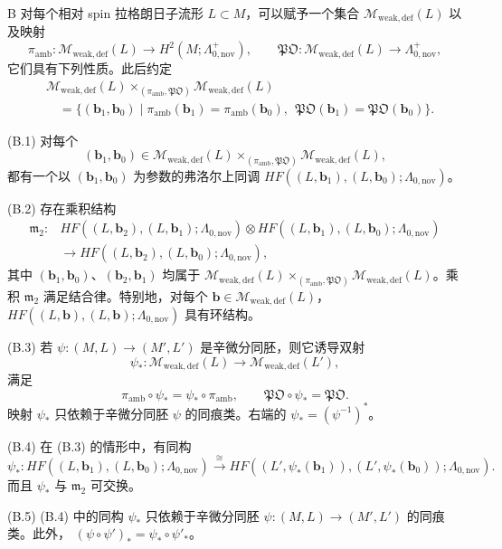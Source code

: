 \begin{theorem}{B}\label{thm:B}
对每个相对 spin 拉格朗日子流形 $L\subset M$，可以赋予一个集合
$\mathcal M_{\mathrm{weak,def}}(L)$ 以及映射
\[
  \pi_{\mathrm{amb}}\colon\mathcal M_{\mathrm{weak,def}}(L)
  \longrightarrow H^2(M;\Lambda^+_{0,\mathrm{nov}}),
  \qquad
  \mathfrak{PO}\colon\mathcal M_{\mathrm{weak,def}}(L)
  \longrightarrow\Lambda^+_{0,\mathrm{nov}},
\]
它们具有下列性质。此后约定
\begin{equation}
\begin{aligned}
  &\mathcal M_{\mathrm{weak,def}}(L)
  \mathbin{\times_{(\pi_{\mathrm{amb}},\mathfrak{PO})}}
  \mathcal M_{\mathrm{weak,def}}(L)\\
  &\quad=\{(\mathbf b_1,\mathbf b_0)\mid
  \pi_{\mathrm{amb}}(\mathbf b_1)=\pi_{\mathrm{amb}}(\mathbf b_0),\
  \ \mathfrak{PO}(\mathbf b_1)=\mathfrak{PO}(\mathbf b_0)\}.
\end{aligned}
\tag{1.9}\label{eq:1-9}
\end{equation}

\textup{(B.1)} 对每个
\[
  (\mathbf b_1,\mathbf b_0)\in
  \mathcal M_{\mathrm{weak,def}}(L)
  \mathbin{\times_{(\pi_{\mathrm{amb}},\mathfrak{PO})}}
  \mathcal M_{\mathrm{weak,def}}(L),
\]
都有一个以 $(\mathbf b_1,\mathbf b_0)$ 为参数的弗洛尔上同调
$HF((L,\mathbf b_1),(L,\mathbf b_0);\Lambda_{0,\mathrm{nov}})$。

\textup{(B.2)} 存在乘积结构
\[
\begin{aligned}
  \mathfrak m_2\colon
  &HF((L,\mathbf b_2),(L,\mathbf b_1);\Lambda_{0,\mathrm{nov}})
  \otimes HF((L,\mathbf b_1),(L,\mathbf b_0);\Lambda_{0,\mathrm{nov}})\\
  &\longrightarrow HF((L,\mathbf b_2),(L,\mathbf b_0);\Lambda_{0,\mathrm{nov}}),
\end{aligned}
\]
其中 $(\mathbf b_1,\mathbf b_0)$、$(\mathbf b_2,\mathbf b_1)$ 均属于
$\mathcal M_{\mathrm{weak,def}}(L)
\mathbin{\times_{(\pi_{\mathrm{amb}},\mathfrak{PO})}}
\mathcal M_{\mathrm{weak,def}}(L)$。乘积 $\mathfrak m_2$ 满足结合律。特别地，对每个
$\mathbf b\in\mathcal M_{\mathrm{weak,def}}(L)$，$HF((L,\mathbf b),(L,\mathbf b);\Lambda_{0,\mathrm{nov}})$
具有环结构。

\textup{(B.3)} 若 $\psi\colon(M,L)\to(M',L')$ 是辛微分同胚，则它诱导双射
\[
  \psi_*\colon\mathcal M_{\mathrm{weak,def}}(L)
  \longrightarrow\mathcal M_{\mathrm{weak,def}}(L'),
\]
满足
\[
  \pi_{\mathrm{amb}}\circ\psi_*=\psi_*\circ\pi_{\mathrm{amb}},
  \qquad
  \mathfrak{PO}\circ\psi_*=\mathfrak{PO}.
\]
映射 $\psi_*$ 只依赖于辛微分同胚 $\psi$ 的同痕类。右端的
$\psi_*=(\psi^{-1})^*$。

\textup{(B.4)} 在 (B.3) 的情形中，有同构
\[
  \psi_*\colon HF((L,\mathbf b_1),(L,\mathbf b_0);\Lambda_{0,\mathrm{nov}})
  \xrightarrow{\ \cong\ }
  HF((L',\psi_*(\mathbf b_1)),(L',\psi_*(\mathbf b_0));\Lambda_{0,\mathrm{nov}}).
\]
而且 $\psi_*$ 与 $\mathfrak m_2$ 可交换。

\textup{(B.5)} (B.4) 中的同构 $\psi_*$ 只依赖于辛微分同胚
$\psi\colon(M,L)\to(M',L')$ 的同痕类。此外，
$(\psi\circ\psi')_*=\psi_*\circ\psi'_* $。
\end{theorem}

